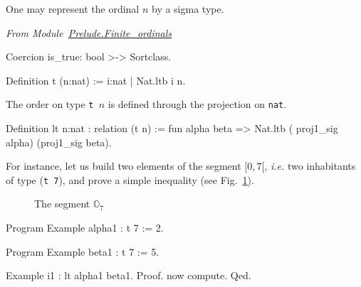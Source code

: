 One may represent the ordinal $n$ by a sigma type.


\vspace{4pt}
\noindent\emph{From Module~\href{../src/html/hydras.Prelude.Finite_ordinals.html}{Prelude.Finite\_ordinals}}

\label{def: Finite-ord-type}
\begin{Coqsrc}
Coercion is_true: bool >-> Sortclass.

Definition t (n:nat) := {i:nat | Nat.ltb i  n}.
\end{Coqsrc}

The order on type \texttt{t $n$} is defined through the projection on \texttt{nat}.


\begin{Coqsrc}
Definition lt {n:nat} : relation (t n) :=
  fun alpha beta => Nat.ltb ( proj1_sig alpha) (proj1_sig beta).
\end{Coqsrc}

For instance, let us build two elements of the segment $[0, 7[$, \emph{i.e.} two
inhabitants of   type (\texttt{t 7}), and prove a simple  inequality (see Fig.~\ref{fig:O7}).

\begin{figure}[h]
\centering
{}

\caption{The segment $\mathbb{O}_7$\label{fig:O7}}
\end{figure}
  

\begin{Coqsrc}
Program Example alpha1 : t 7 := 2.

Program Example beta1 : t 7 := 5.

Example i1 : lt  alpha1 beta1.
Proof.   now compute. Qed.
\end{Coqsrc}




